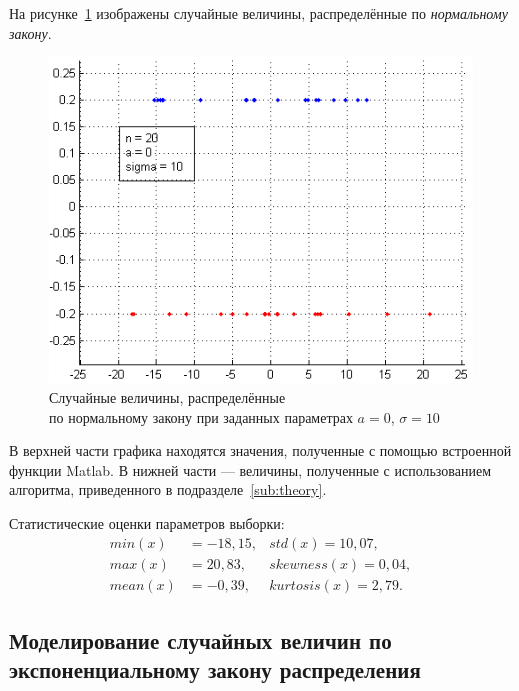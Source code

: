 На рисунке~\ref{pic:normal} изображены случайные величины, распределённые
по \textit{нормальному закону}.
\begin{figure}[h!]
  \centering
  \includegraphics[width=0.9\linewidth]{pic/normal}
  \caption{Случайные величины, распределённые \\ по нормальному закону при заданных параметрах $ a = 0 $, $ \sigma = 10 $}
  \label{pic:normal}
\end{figure}

В верхней части графика находятся значения, полученные с помощью
встроенной функции Matlab. В нижней части --- величины, полученные
с использованием алгоритма, приведенного в подразделе~\ref{sub:theory}.

Статистические оценки параметров выборки:
\begin{align*}
  min (x)  &= -18{,}15, & std (x) = 10{,}07, \\
  max (x)  &= 20{,}83,  & skewness (x) = 0{,}04, \\
  mean (x) &= -0{,}39,  & kurtosis (x) = 2{,}79.
\end{align*}

\newpage

\subsection{Моделирование случайных величин по экспоненциальному закону распределения}

